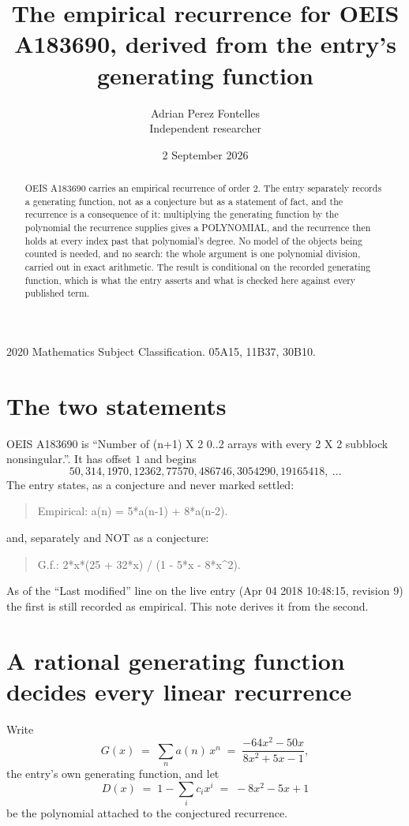 \documentclass[11pt,a4paper]{article}
\title{The empirical recurrence for OEIS A183690, derived from the entry's generating function}
\author{Adrian Perez Fontelles\\ \small Independent researcher}
\date{2 September 2026}
\theoremstyle{plain}
\theoremstyle{definition}
\begin{document}
\maketitle

\begin{abstract}
OEIS A183690 carries an empirical recurrence of order $2$. The entry separately records a
generating function, not as a conjecture but as a statement of fact, and the recurrence is a
consequence of it: multiplying the generating function by the polynomial the recurrence
supplies gives a POLYNOMIAL, and the recurrence then holds at every index past that
polynomial's degree. No model of the objects being counted is needed, and no search: the
whole argument is one polynomial division, carried out in exact arithmetic. The result is
conditional on the recorded generating function, which is what the entry asserts and what is
checked here against every published term.
\end{abstract}

\noindent\small 2020 Mathematics Subject Classification. 05A15, 11B37, 30B10.\normalsize

\section{The two statements}

OEIS A183690 is ``Number of (n+1) X 2 0..2 arrays with every 2 X 2 subblock nonsingular.''. It has offset $1$ and begins
\[
50, 314, 1970, 12362, 77570, 486746, 3054290, 19165418,\ \dots
\]
The entry states, as a conjecture and never marked settled:
\begin{quote}
Empirical: a(n) = 5*a(n-1) + 8*a(n-2).
\end{quote}
and, separately and NOT as a conjecture:
\begin{quote}
G.f.: 2*x*(25 + 32*x) / (1 - 5*x - 8*x\^{}2).
\end{quote}
As of the ``Last modified'' line on the live entry (Apr 04 2018 10:48:15, revision 9) the first is still
recorded as empirical. This note derives it from the second.

\section{A rational generating function decides every linear recurrence}

Write
\[
G(x)\;=\;\sum_{n}a(n)\,x^{n}\;=\;\frac{- 64 x^{2} - 50 x}{8 x^{2} + 5 x - 1},
\]
the entry's own generating function, and let
\[
D(x)\;=\;1-\sum_i c_i x^{i}\;=\;- 8 x^{2} - 5 x + 1
\]
be the polynomial attached to the conjectured recurrence.
\end{document}
